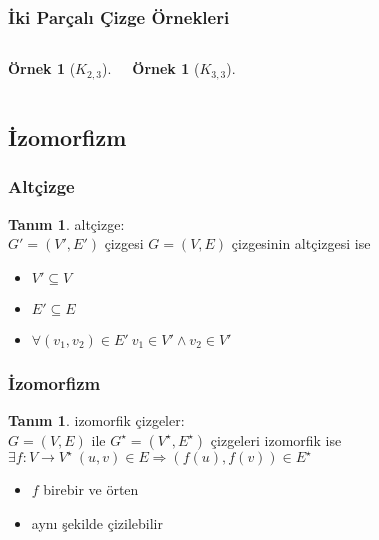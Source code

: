 \documentclass[dvipsnames]{beamer}
\theoremstyle{definition}
\newtheorem{tanim}[theorem]{Tanım}
\theoremstyle{example}
\newtheorem{ornek}[theorem]{Örnek}
\theoremstyle{plain}
\begin{document}
\begin{frame}
  \frametitle{İki Parçalı Çizge Örnekleri}

  \begin{columns}[t]
    \begin{ornek}[$K_{2,3}$]
      \begin{center}
      \end{center}
    \end{ornek}

    \begin{ornek}[$K_{3,3}$]
      \begin{center}
      \end{center}
    \end{ornek}
  \end{columns}
\end{frame}

\subsection{İzomorfizm}

\begin{frame}
  \frametitle{Altçizge}

  \begin{tanim}
    \alert{altçizge}:\\
      $G'=(V',E')$ çizgesi $G=(V,E)$ çizgesinin altçizgesi ise

    \begin{itemize}
      \item $V' \subseteq V$
      \item $E' \subseteq E$
      \item $\forall (v_1,v_2) \in E'~v_1 \in V' \wedge v_2 \in V'$
    \end{itemize}
  \end{tanim}
\end{frame}


\begin{frame}
  \frametitle{İzomorfizm}

  \begin{tanim}
    \alert{izomorfik çizgeler}:\\
    $G=(V,E)$ ile $G^\star=(V^\star,E^\star)$ çizgeleri izomorfik ise\\
    $\exists f: V \rightarrow V^\star~(u,v) \in E \Rightarrow (f(u),f(v)) \in E^\star$

    \begin{itemize}
      \item $f$ birebir ve örten
    \end{itemize}
  \end{tanim}

  \pause
  \begin{itemize}
    \item aynı şekilde çizilebilir
  \end{itemize}
\end{frame}
\end{document}
